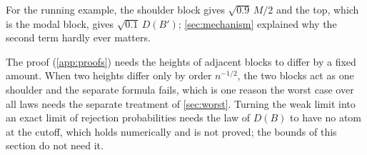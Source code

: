 For the running example, the shoulder block gives $\sqrt{0.9}\,M/2$ and the top, which is the modal block, gives $\sqrt{0.1}\,D(B')$; \cref{sec:mechanism} explained why the second term hardly ever matters.

The proof (\cref{app:proofs}) needs the heights of adjacent blocks to differ by a fixed amount. When two heights differ only by order $n^{-1/2}$, the two blocks act as one shoulder and the separate formula fails, which is one reason the worst case over all laws needs the separate treatment of \cref{sec:worst}. Turning the weak limit into an exact limit of rejection probabilities needs the law of $D(B)$ to have no atom at the cutoff, which holds numerically and is not proved; the bounds of this section do not need it.
